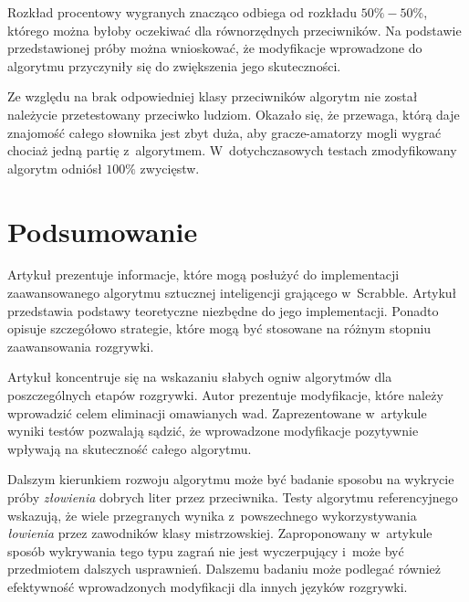 \documentclass[a4paper,twocolumn,11pt]{article}
\theoremstyle{definition}
\begin{document}
Rozkład procentowy wygranych znacząco odbiega od rozkładu $50\% - 50\%$, którego można byłoby oczekiwać dla równorzędnych przeciwników. Na podstawie przedstawionej próby można wnioskować, że modyfikacje wprowadzone do algorytmu przyczyniły się do zwiększenia jego skuteczności.

Ze względu na brak odpowiedniej klasy przeciwników algorytm nie został należycie przetestowany przeciwko ludziom. Okazało się, że przewaga, którą daje znajomość całego słownika jest zbyt duża, aby gracze-amatorzy mogli wygrać chociaż jedną partię z~algorytmem. W~dotychczasowych testach zmodyfikowany algorytm odniósł $100\%$ zwycięstw.

\section{Podsumowanie}

Artykuł prezentuje informacje, które mogą posłużyć do implementacji zaawansowanego algorytmu sztucznej inteligencji grającego w~Scrabble. Artykuł przedstawia podstawy teoretyczne niezbędne do jego implementacji. Ponadto opisuje szczegółowo  strategie, które mogą być stosowane na różnym stopniu zaawansowania rozgrywki. 

Artykuł koncentruje się na wskazaniu słabych ogniw algorytmów dla poszczególnych etapów rozgrywki. Autor prezentuje modyfikacje, które należy wprowadzić celem eliminacji omawianych wad. Zaprezentowane w~artykule wyniki testów pozwalają sądzić, że wprowadzone modyfikacje pozytywnie wpływają na skuteczność całego algorytmu. 

Dalszym kierunkiem rozwoju algorytmu może być badanie sposobu na wykrycie próby \emph{złowienia} dobrych liter przez przeciwnika. Testy algorytmu referencyjnego wskazują, że wiele przegranych wynika z~powszechnego wykorzystywania \emph{łowienia} przez zawodników klasy mistrzowskiej. Zaproponowany w~artykule sposób wykrywania tego typu zagrań nie jest wyczerpujący i~może być przedmiotem dalszych usprawnień. Dalszemu badaniu może podlegać również efektywność wprowadzonych modyfikacji dla innych języków rozgrywki.
\end{document}

